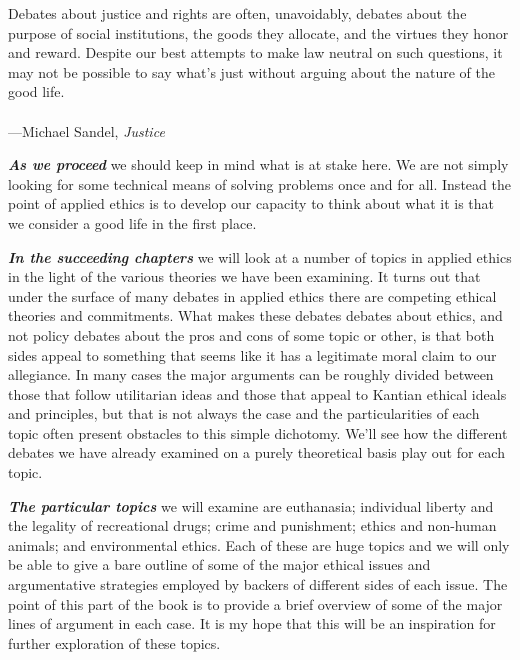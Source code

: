\documentclass[
  12pt, openany]{book}
\newenvironment{epigraph}%
{
\begin{flushright}
\begin{minipage}{30em}
\begin{flushright}
\itshape
}%
{
\end{flushright}
\end{minipage}
\end{flushright}
\vspace{1em}
}
\theoremstyle{definition}
\theoremstyle{definition}
\theoremstyle{definition}
\theoremstyle{remark}
\begin{document}
\begin{epigraph}

Debates about justice and rights are often, unavoidably, debates about the purpose of social institutions, the goods they allocate, and the virtues they honor and reward. Despite our best attempts to make law neutral on such questions, it may not be possible to say what's just without arguing about the nature of the good life.\\
~\\
---Michael Sandel, \emph{Justice}

\end{epigraph}

\textbf{\emph{As we proceed}} we should keep in mind what is at stake here. We are not simply looking for some technical means of solving problems once and for all. Instead the point of applied ethics is to develop our capacity to think about what it is that we consider a good life in the first place.

\textbf{\emph{In the succeeding chapters}} we will look at a number of topics in applied ethics in the light of the various theories we have been examining. It turns out that under the surface of many debates in applied ethics there are competing ethical theories and commitments. What makes these debates debates about ethics, and not policy debates about the pros and cons of some topic or other, is that both sides appeal to something that seems like it has a legitimate moral claim to our allegiance. In many cases the major arguments can be roughly divided between those that follow utilitarian ideas and those that appeal to Kantian ethical ideals and principles, but that is not always the case and the particularities of each topic often present obstacles to this simple dichotomy. We'll see how the different debates we have already examined on a purely theoretical basis play out for each topic.

\textbf{\emph{The particular topics}} we will examine are euthanasia; individual liberty and the legality of recreational drugs; crime and punishment; ethics and non-human animals; and environmental ethics. Each of these are huge topics and we will only be able to give a bare outline of some of the major ethical issues and argumentative strategies employed by backers of different sides of each issue. The point of this part of the book is to provide a brief overview of some of the major lines of argument in each case. It is my hope that this will be an inspiration for further exploration of these topics.
\end{document}
